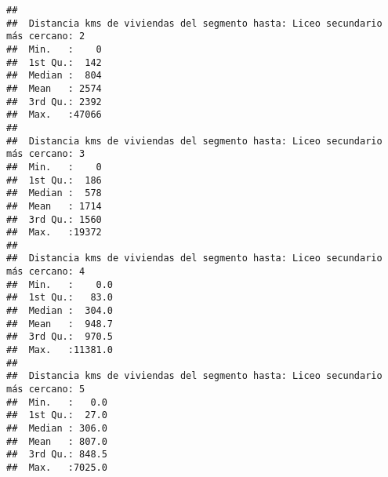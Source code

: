 \documentclass[11pt,]{article}
\begin{document}
\begin{verbatim}
##                                                                                
##  Distancia kms de viviendas del segmento hasta: Liceo secundario más cercano: 2
##  Min.   :    0                                                                 
##  1st Qu.:  142                                                                 
##  Median :  804                                                                 
##  Mean   : 2574                                                                 
##  3rd Qu.: 2392                                                                 
##  Max.   :47066                                                                 
##                                                                                
##  Distancia kms de viviendas del segmento hasta: Liceo secundario más cercano: 3
##  Min.   :    0                                                                 
##  1st Qu.:  186                                                                 
##  Median :  578                                                                 
##  Mean   : 1714                                                                 
##  3rd Qu.: 1560                                                                 
##  Max.   :19372                                                                 
##                                                                                
##  Distancia kms de viviendas del segmento hasta: Liceo secundario más cercano: 4
##  Min.   :    0.0                                                               
##  1st Qu.:   83.0                                                               
##  Median :  304.0                                                               
##  Mean   :  948.7                                                               
##  3rd Qu.:  970.5                                                               
##  Max.   :11381.0                                                               
##                                                                                
##  Distancia kms de viviendas del segmento hasta: Liceo secundario más cercano: 5
##  Min.   :   0.0                                                                
##  1st Qu.:  27.0                                                                
##  Median : 306.0                                                                
##  Mean   : 807.0                                                                
##  3rd Qu.: 848.5                                                                
##  Max.   :7025.0                                                                

\end{verbatim}
\end{document}
